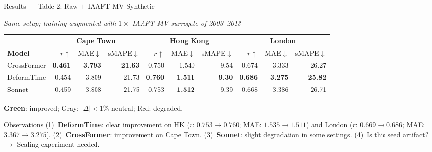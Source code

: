 \documentclass[aspectratio=169,10pt]{beamer}
\begin{document}
\begin{frame}{Results --- Table 2: Raw $+$ IAAFT-MV Synthetic}
  \vspace{-0.2em}
  \begin{center}
    {\small\textit{Same setup; training augmented with
    $1\times$ IAAFT-MV surrogate of 2003--2013}}
  \end{center}
  \vspace{0.1em}
  \begin{table}
    \centering
    \footnotesize
    \setlength{\tabcolsep}{5pt}
    \begin{tabular}{l rrr rrr rrr}
      \toprule
      & \multicolumn{3}{c}{\textbf{Cape Town}}
      & \multicolumn{3}{c}{\textbf{Hong Kong}}
      & \multicolumn{3}{c}{\textbf{London}} \\
      \cmidrule(lr){2-4}\cmidrule(lr){5-7}\cmidrule(lr){8-10}
      \textbf{Model}
        & $r{\uparrow}$ & MAE${\downarrow}$ & sMAPE${\downarrow}$
        & $r{\uparrow}$ & MAE${\downarrow}$ & sMAPE${\downarrow}$
        & $r{\uparrow}$ & MAE${\downarrow}$ & sMAPE${\downarrow}$ \\
      \midrule
      CrossFormer
        & \textcolor{mygreen}{\textbf{0.461}}
        & \textcolor{mygreen}{\textbf{3.793}}
        & \textcolor{mygreen}{\textbf{21.63}}
        & \textcolor{mygray}{0.750}
        & \textcolor{myred}{1.540}
        & \textcolor{myred}{9.54}
        & \textcolor{mygray}{0.674}
        & \textcolor{mygray}{3.333}
        & \textcolor{mygray}{26.27} \\[1pt]
      DeformTime
        & \textcolor{mygray}{0.454}
        & \textcolor{mygray}{3.809}
        & \textcolor{mygray}{21.73}
        & \textcolor{mygreen}{\textbf{0.760}}
        & \textcolor{mygreen}{\textbf{1.511}}
        & \textcolor{mygreen}{\textbf{9.30}}
        & \textcolor{mygreen}{\textbf{0.686}}
        & \textcolor{mygreen}{\textbf{3.275}}
        & \textcolor{mygreen}{\textbf{25.82}} \\[1pt]
      Sonnet
        & \textcolor{myred}{0.459}
        & \textcolor{mygray}{3.808}
        & \textcolor{mygray}{21.75}
        & \textcolor{myred}{0.753}
        & \textcolor{mygreen}{\textbf{1.512}}
        & \textcolor{mygray}{9.39}
        & \textcolor{myred}{0.668}
        & \textcolor{myred}{3.386}
        & \textcolor{myred}{26.71} \\
      \bottomrule
    \end{tabular}
  \end{table}
  {\footnotesize
   \textcolor{mygreen}{\textbf{Green}}: improved;\;
   \textcolor{mygray}{Gray}: $|\Delta|<1\%$ neutral;\;
   \textcolor{myred}{Red}: degraded.}
  \vspace{0.2em}
  \begin{block}{Observations}
    \small
    (1)~\textbf{DeformTime}: clear improvement on HK
        ($r$: $0.753\!\to\!0.760$; MAE: $1.535\!\to\!1.511$) and
        London ($r$: $0.669\!\to\!0.686$; MAE: $3.367\!\to\!3.275$).
    \;(2)~\textbf{CrossFormer}: improvement on Cape Town.
    \;(3)~\textbf{Sonnet}: slight degradation in some settings.
    \;(4)~Is this seed artifact? $\to$ Scaling experiment needed.
  \end{block}
\end{frame}
\end{document}
